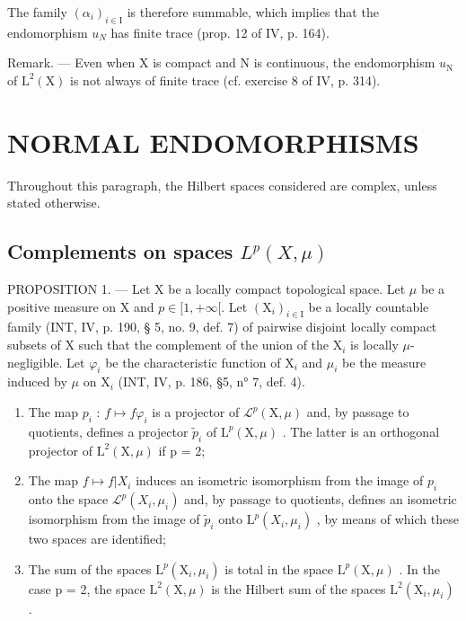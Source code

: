 The family \((\alpha_{i})_{i\in\mathrm{I}}\) is therefore summable, which implies that the endomorphism \(u_{N}\) has finite trace (prop. 12 of IV, p. 164).

Remark. --- Even when X is compact and N is continuous, the endomorphism \(u_{\mathrm{N}}\) of \(\mathrm{L}^{2}(\mathrm{X})\) is not always of finite trace (cf. exercise 8 of IV, p. 314).

\section{NORMAL ENDOMORPHISMS}

Throughout this paragraph, the Hilbert spaces considered are complex, unless stated otherwise.

\subsection{\texorpdfstring{Complements on spaces \(L^{p}(X,\mu)\)}{Further results on L spaces\^{}\{p\}(X,\textbackslash mu)}}

PROPOSITION 1. --- Let X be a locally compact topological space. Let \(\mu\) be a positive measure on X and \(p \in [1, +\infty[\). Let \((\mathrm{X}_i)_{i \in \mathrm{I}}\) be a locally countable family (INT, IV, p. 190, § 5, no. 9, def. 7) of pairwise disjoint locally compact subsets of X such that the complement of the union of the \(\mathrm{X}_i\) is locally \(\mu\)-negligible. Let \(\varphi_i\) be the characteristic function of \(\mathrm{X}_i\) and \(\mu_i\) be the measure induced by \(\mu\) on \(\mathrm{X}_i\) (INT, IV, p. 186, §5, n° 7, def. 4).

\begin{enumerate}
\def\labelenumi{\alph{enumi})}
\item
  The map \(p_{i}\) : \(f \mapsto f\varphi_{i}\) is a projector of \(\mathcal{L}^{p}(\mathrm{X}, \mu)\) and, by passage to quotients, defines a projector \(\widetilde{p}_{i}\) of \(\mathrm{L}^{p}(\mathrm{X}, \mu)\) . The latter is an orthogonal projector of \(\mathrm{L}^{2}(\mathrm{X}, \mu)\) if p = 2;
\item
  The map \(f \mapsto f|X_i\) induces an isometric isomorphism from the image of \(p_i\) onto the space \(\mathcal{L}^p(X_i, \mu_i)\) and, by passage to quotients, defines an isometric isomorphism from the image of \(\widetilde{p}_i\) onto \(\mathrm{L}^p(X_i, \mu_i)\) , by means of which these two spaces are identified;
\item
  The sum of the spaces \(\mathrm{L}^{p}(\mathrm{X}_{i},\mu_{i})\) is total in the space \(\mathrm{L}^{p}(\mathrm{X},\mu)\) . In the case p = 2, the space \(\mathrm{L}^{2}(\mathrm{X},\mu)\) is the Hilbert sum of the spaces \(\mathrm{L}^{2}(\mathrm{X}_{i},\mu_{i})\) .
\end{enumerate}

